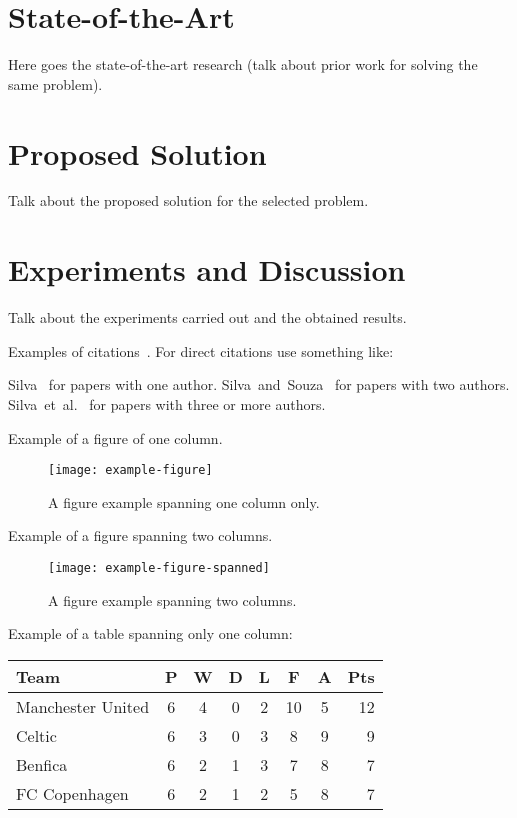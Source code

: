 \documentclass[10pt,twocolumn,letterpaper]{article}
\newcommand{\CITEONE}[2]{\mbox{#1 \cite{#2}}}
\newcommand{\CITETWO}[3]{\mbox{#1 and #2 \cite{#3}}}
\newcommand{\CITEN}[2]{\mbox{#1 et al. \cite{#2}}}
\begin{document}
\section{State-of-the-Art}
Here goes the state-of-the-art research (talk about prior work for solving the same problem). 

\section{Proposed Solution}
Talk about the proposed solution for the selected problem. 

\section{Experiments and Discussion}
Talk about the experiments carried out and the obtained results. 

Examples of citations~\cite{Ni_2008, Ni_2009}. For direct citations use something like: 

\CITEONE{Silva}{Silva_2010} for papers with one author.
\CITETWO{Silva}{Souza}{Silva_2010b} for papers with two authors.
\CITEN{Silva}{Silva_2010c} for papers with three or more authors.

Example of a figure of one column. 
\begin{figure}
\begin{center}
	\texttt{[image: example-figure]}
	\caption{A figure example spanning one column only.\label{fig:label}}   
\end{center} 
\end{figure}   

Example of a figure spanning two columns. 
\begin{figure*}
\begin{center}
	\texttt{[image: example-figure-spanned]}
	\caption{A figure example spanning two columns.\label{fig:label2}}   
\end{center} 
\end{figure*}

Example of a table spanning only one column: 

\begin{table}
\begin{center}
\begin{tabular}{l*{6}{c}r}
Team              & P & W & D & L & F  & A & Pts \\
\hline
Manchester United & 6 & 4 & 0 & 2 & 10 & 5 & 12  \\
Celtic            & 6 & 3 & 0 & 3 &  8 & 9 &  9  \\
Benfica           & 6 & 2 & 1 & 3 &  7 & 8 &  7  \\
FC Copenhagen     & 6 & 2 & 1 & 2 &  5 & 8 &  7  \\
\end{tabular}
\end{center}
\end{table}
\end{document}
